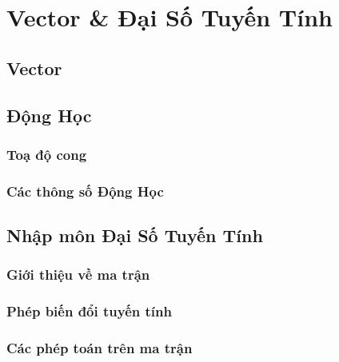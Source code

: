   
\chapter{Vector \& Đại Số Tuyến Tính}


\section{Vector}
\section{Động Học}
\subsection{Toạ độ cong}
\subsection{Các thông số Động Học}

\section{Nhập môn Đại Số Tuyến Tính}
\subsection{Giới thiệu về ma trận}

\subsection{Phép biến đổi tuyến tính}
\subsection{Các phép toán trên ma trận}

\begin{refsection}
\nocite{linear123, extrabook}
\printbibliography
\end{refsection}